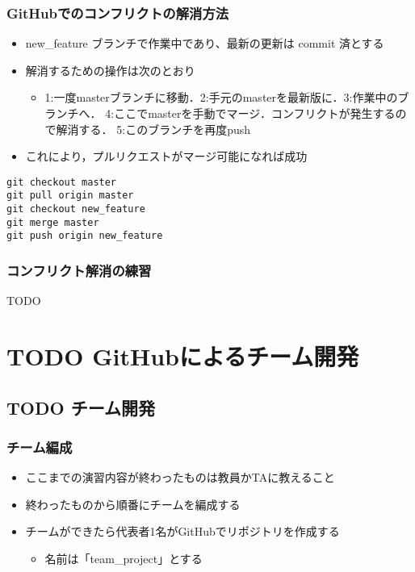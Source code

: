 \documentclass[a4paper,twoside,twocolumn]{bxjsarticle}
\begin{document}
\subsubsection{GitHubでのコンフリクトの解消方法}
\label{sec-2-4-2}
\begin{itemize}
\item new\_feature ブランチで作業中であり、最新の更新は commit 済とする

\item 解消するための操作は次のとおり
\begin{itemize}
\item 1:一度masterブランチに移動．2:手元のmasterを最新版に．3:作業中のブランチへ．
4:ここでmasterを手動でマージ．コンフリクトが発生するので解消する．
5:このブランチを再度push
\end{itemize}
\item これにより，プルリクエストがマージ可能になれば成功
\end{itemize}

\begin{verbatim}
git checkout master
git pull origin master
git checkout new_feature
git merge master
git push origin new_feature
\end{verbatim}

\subsubsection{コンフリクト解消の練習}
\label{sec-2-4-3}
TODO
\section{{\bfseries\sffamily TODO} GitHubによるチーム開発}
\label{sec-3}
\subsection{{\bfseries\sffamily TODO} チーム開発}
\label{sec-3-1}
\subsubsection{チーム編成}
\label{sec-3-1-1}
\begin{itemize}
\item ここまでの演習内容が終わったものは教員かTAに教えること
\item 終わったものから順番にチームを編成する
\item チームができたら代表者1名がGitHubでリポジトリを作成する
\begin{itemize}
\item 名前は「team\_project」とする
\end{itemize}
\end{itemize}
\end{document}
